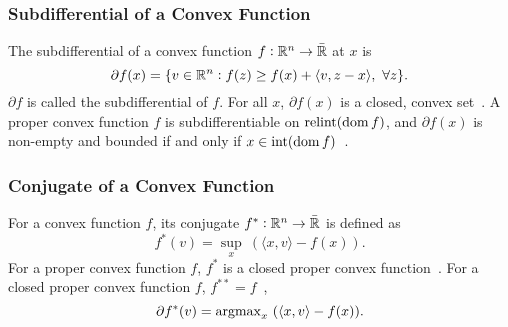 \subsubsection{Subdifferential of a Convex Function}
\label{subsubsec:subdifferential-of-a-convex-function}

The subdifferential of a convex function $f: \mathbb{R}^n \rightarrow \bar{\mathbb{R}}$ at $x$ is~\cite[Sec.~23]{rockafellar1997convex}
\begin{equation}
\label{eq:subdifferential-definition}
    \partial{f}(x) = \{v \in \mathbb{R}^n: f(z) \geq f(x) + \langle v, z-x\rangle, \ \forall z\}.
\end{equation}
$\partial{f}$ is called the subdifferential of $f$.
For all $x$, $\partial{f}(x)$ is a closed, convex set~\cite[Sec.~23]{rockafellar1997convex}.
A proper convex function $f$ is subdifferentiable on $\operatorname{relint}(\operatorname{dom}{f})$, and $\partial{f}(x)$ is non-empty and bounded if and only if $x \in \operatorname{int}(\operatorname{dom}{f})$~\cite[Th.~23.4]{rockafellar1997convex}.


\subsubsection{Conjugate of a Convex Function}
\label{subsubsec:conjugate-of-a-convex-function}

For a convex function $f$, its conjugate $f^*: \mathbb{R}^n \rightarrow \bar{\mathbb{R}}$ is defined as~\cite[Sec.~12]{rockafellar1997convex}
\begin{equation}
\label{eq:conv-analysis-conjugate}
    f^*(v) = \textstyle{\sup}_x \ (\langle x, v\rangle - f(x)).
\end{equation}
For a proper convex function $f$, $f^*$ is a closed proper convex function~\cite[Thm.~12.2]{rockafellar1997convex}.
For a closed proper convex function $f$, $f^{**} = f$~\cite[Cor.~12.2.1]{rockafellar1997convex}, 
\begin{equation}
\label{eq:conv-analysis-conjugate-subgrad}
    \partial{f^*}(v) = \textstyle{\operatorname*{argmax}}_x \ (\langle x, v\rangle - f(x)).
\end{equation}


